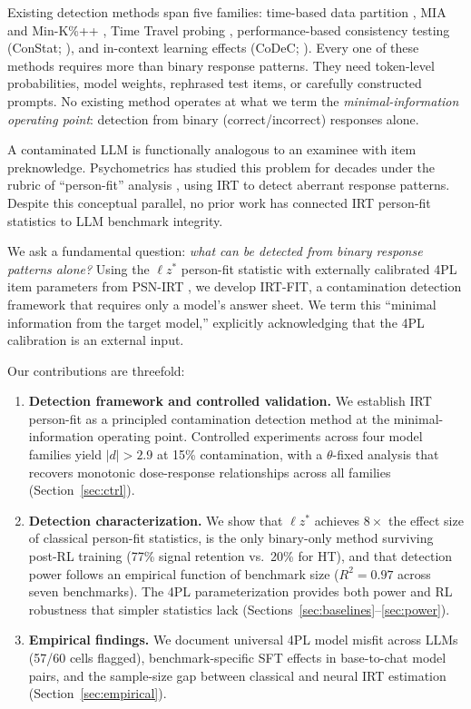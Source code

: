 \documentclass[11pt,a4paper]{article}
\newcommand{\lzstar}{$\ell z^*$}
\newcommand{\thetafixed}{$\theta$-fixed}
\begin{document}
Existing detection methods span five families: time-based data partition \citep{jacovi2023}, MIA and Min-K\%++ \citep{shi2024mink}, Time Travel probing \citep{dong2024timetravel}, performance-based consistency testing (ConStat; \citealt{dekoninck2024constat}), and in-context learning effects (CoDeC; \citealt{shi2024codec}). Every one of these methods requires more than binary response patterns. They need token-level probabilities, model weights, rephrased test items, or carefully constructed prompts. No existing method operates at what we term the \emph{minimal-information operating point}: detection from binary (correct/incorrect) responses alone.

A contaminated LLM is functionally analogous to an examinee with item preknowledge. Psychometrics has studied this problem for decades under the rubric of ``person-fit'' analysis \citep{meijer2001personfit}, using IRT to detect aberrant response patterns. Despite this conceptual parallel, no prior work has connected IRT person-fit statistics to LLM benchmark integrity.

We ask a fundamental question: \emph{what can be detected from binary response patterns alone?} Using the \lzstar{} person-fit statistic \citep{drasgow1985lz, snijders2001lzstar} with externally calibrated 4PL item parameters from PSN-IRT \citep{psnirt2026}, we develop IRT-FIT, a contamination detection framework that requires only a model's answer sheet. We term this ``minimal information from the target model,'' explicitly acknowledging that the 4PL calibration is an external input.

Our contributions are threefold:

\begin{enumerate}[leftmargin=*,itemsep=2pt]
\item \textbf{Detection framework and controlled validation.} We establish IRT person-fit as a principled contamination detection method at the minimal-information operating point. Controlled experiments across four model families yield $|d|>2.9$ at 15\% contamination, with a \thetafixed{} analysis that recovers monotonic dose-response relationships across all families (Section~\ref{sec:ctrl}).
\item \textbf{Detection characterization.} We show that \lzstar{} achieves $8\times$ the effect size of classical person-fit statistics, is the only binary-only method surviving post-RL training (77\% signal retention vs.\ 20\% for HT), and that detection power follows an empirical function of benchmark size ($R^2=0.97$ across seven benchmarks). The 4PL parameterization provides both power and RL robustness that simpler statistics lack (Sections~\ref{sec:baselines}--\ref{sec:power}).
\item \textbf{Empirical findings.} We document universal 4PL model misfit across LLMs (57/60 cells flagged), benchmark-specific SFT effects in base-to-chat model pairs, and the sample-size gap between classical and neural IRT estimation (Section~\ref{sec:empirical}).
\end{enumerate}
\end{document}
